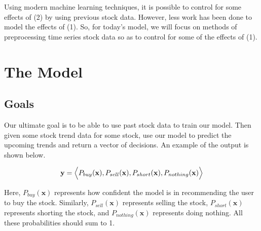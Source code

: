 \documentclass[final]{article}
\begin{document}
Using modern machine learning techniques, it is possible to control
for some effects of (2) by using previous stock data. However,
less work has been done to model the effects of (1). So, for today's
model, we will focus on methods of preprocessing time series stock
data so as to control for some of the effects of (1).

\section{The Model}

\subsection{Goals}
Our ultimate goal is to be able to use past stock data to train our
model. Then given some stock trend data for some stock, use our model
to predict the upcoming trends and return a vector of decisions. An
example of the output is shown below.

\[
  \mathbf{y} = \Bigl<P_{buy}(\mathbf{x}), P_{sell}(\mathbf{x}),
  P_{short}(\mathbf{x}), P_{nothing}(\mathbf{x})\Bigr>
\]

Here, $P_{buy}(\mathbf{x})$ represents how confident the model is in
recommending the user to buy the stock. Similarly,
$P_{sell}(\mathbf{x})$ represents selling the stock,
$P_{short}(\mathbf{x})$ represents shorting the stock, and
$P_{nothing}(\mathbf{x})$ represents doing nothing. All these
probabilities should sum to 1.
\end{document}
